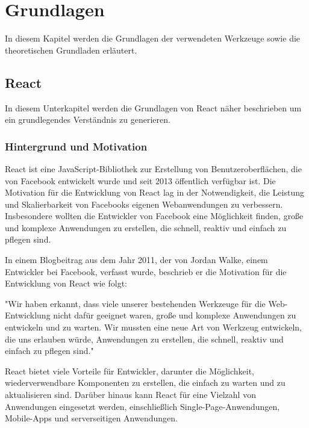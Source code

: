 
\chapter{Grundlagen}
In diesem Kapitel werden die Grundlagen der verwendeten Werkzeuge sowie die theoretischen Grundladen erläutert.
\section{React}
In diesem Unterkapitel werden die Grundlagen von React näher beschrieben um ein grundlegendes Verständnis zu generieren.

\subsection{Hintergrund und Motivation}
React ist eine JavaScript-Bibliothek zur Erstellung von Benutzeroberflächen, die von Facebook entwickelt wurde und seit 2013 öffentlich verfügbar ist. Die Motivation für die Entwicklung von React lag in der Notwendigkeit, die Leistung und Skalierbarkeit von Facebooks eigenen Webanwendungen zu verbessern. Insbesondere wollten die Entwickler von Facebook eine Möglichkeit finden, große und komplexe Anwendungen zu erstellen, die schnell, reaktiv und einfach zu pflegen sind.

In einem Blogbeitrag aus dem Jahr 2011, der von Jordan Walke, einem Entwickler bei Facebook, verfasst wurde, beschrieb er die Motivation für die Entwicklung von React wie folgt:

"Wir haben erkannt, dass viele unserer bestehenden Werkzeuge für die Web-Entwicklung nicht dafür geeignet waren, große und komplexe Anwendungen zu entwickeln und zu warten. Wir mussten eine neue Art von Werkzeug entwickeln, die uns erlauben würde, Anwendungen zu erstellen, die schnell, reaktiv und einfach zu pflegen sind." \cite{react-why}

React bietet viele Vorteile für Entwickler, darunter die Möglichkeit, wiederverwendbare Komponenten zu erstellen, die einfach zu warten und zu aktualisieren sind. Darüber hinaus kann React für eine Vielzahl von Anwendungen eingesetzt werden, einschließlich Single-Page-Anwendungen, Mobile-Apps und serverseitigen Anwendungen.

